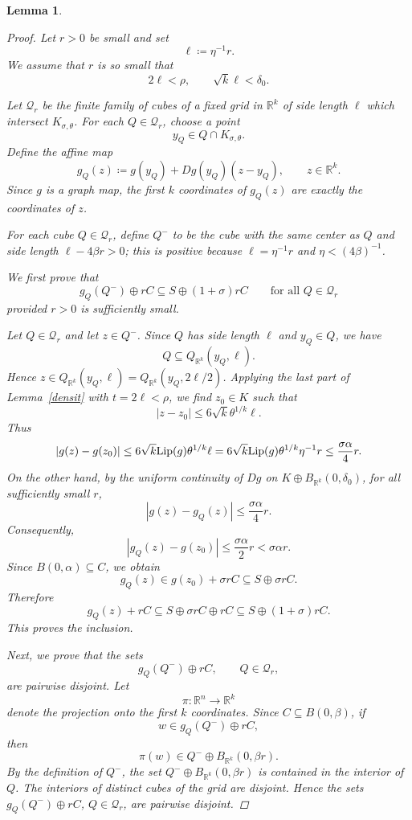 \documentclass[pdflatex,sn-mathphys-num]{sn-jnl}
\theoremstyle{plain}
\newtheorem{lemma}[theorem]{Lemma}
\theoremstyle{definition}
\begin{document}
\begin{lemma}
\begin{proof}
Let $r>0$ be small and set
\[
\ell\coloneq \eta^{-1}r.
\]
We assume that $r$ is so small that
\[
2\ell<\rho,
\qquad
\sqrt{k}\ell<\delta_0.
\]

Let $\mathcal{Q}_r$ be the finite family of cubes of a fixed grid in
$\mathbb R^k$ of side length $\ell$ which intersect $K_{\sigma,\theta}$.
For each $Q\in\mathcal{Q}_r$, choose a point
\[
y_Q\in Q\cap K_{\sigma,\theta}.
\]
Define the affine map
\[
g_Q(z)\coloneq g(y_Q)+Dg(y_Q)(z-y_Q),
\qquad z\in\mathbb R^k.
\]
Since $g$ is a graph map, the first $k$ coordinates of $g_Q(z)$ are exactly
the coordinates of $z$.

For each cube $Q\in\mathcal Q_r$, define $Q^-$ to be the cube with the same
center as $Q$ and side length $\ell-4\beta r>0$; this is positive because
$\ell=\eta^{-1}r$ and $\eta<(4\beta)^{-1}$.

We first prove that
\[
g_Q(Q^-)\oplus rC
\subseteq
S\oplus (1+\sigma)rC
\qquad\text{for all }Q\in\mathcal{Q}_r
\]
provided $r>0$ is sufficiently small.

Let $Q\in\mathcal{Q}_r$ and let $z\in Q^-$. Since $Q$ has side length $\ell$
and $y_Q\in Q$, we have
\[
Q\subseteq Q_{\mathbb{R}^k}(y_Q, \ell).
\]
Hence \(z\in Q_{\mathbb{R}^k}(y_Q,\ell)=Q_{\mathbb{R}^k}(y_Q,2\ell/2)\). Applying the last part of
Lemma~\ref{densit} with \(t=2\ell<\rho\), we find \(z_0\in K\) such that
\[
|z-z_0|\leq 6\sqrt{k}\theta^{1/k}\ell.
\]
Thus
\[
|g(z)-g(z_0)|
\leq
6\sqrt{k}\textup{Lip}(g)\theta^{1/k}\ell
=
6\sqrt{k}\textup{Lip}(g)\theta^{1/k}\eta^{-1}r
\leq
\frac{\sigma\alpha}{4}r.
\]
On the other hand, by the uniform continuity of \(Dg\) on
\(K\oplus B_{\mathbb R^k}(0,\delta_0)\), for all sufficiently small \(r\),
\[
|g(z)-g_Q(z)|
\leq
\frac{\sigma\alpha}{4}r.
\]
Consequently,
\[
|g_Q(z)-g(z_0)|
\leq
\frac{\sigma\alpha}{2}r
<
\sigma\alpha r.
\]
Since \(B(0,\alpha)\subseteq C\), we obtain
\[
g_Q(z)\in g(z_0)+\sigma rC\subseteq S\oplus \sigma rC.
\]
Therefore
\[
g_Q(z)+rC
\subseteq
S\oplus \sigma rC\oplus rC
\subseteq
S\oplus(1+\sigma)rC.
\]
This proves the inclusion.

Next, we prove that the sets
\[
g_Q(Q^-)\oplus rC,
\qquad Q\in\mathcal Q_r,
\]
are pairwise disjoint. Let
\[
\pi:\mathbb R^n\to\mathbb R^k
\]
denote the projection onto the first \(k\) coordinates. Since \(C\subseteq B(0, \beta)\),
if
\[
w\in g_Q(Q^-)\oplus rC,
\]
then
\[
\pi(w)\in Q^-\oplus B_{\mathbb R^k}(0, \beta r).
\]
By the definition of \(Q^-\), the set $Q^-\oplus B_{\mathbb R^k}(0, \beta r)$ is contained in the interior of \(Q\).
The interiors of distinct cubes of the grid are disjoint. Hence the sets
\(g_Q(Q^-)\oplus rC\), \(Q\in\mathcal Q_r\), are pairwise disjoint.


\end{proof}
\end{lemma}
\end{document}
